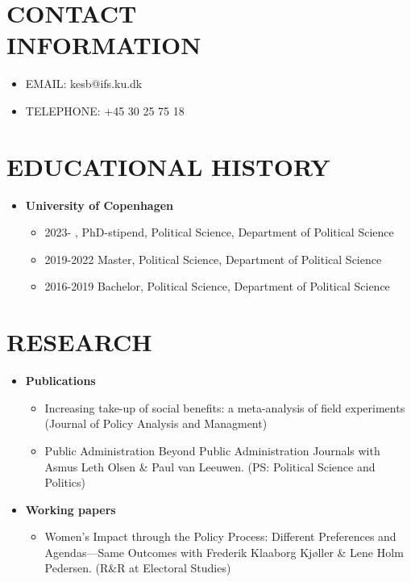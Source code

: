 \documentclass[line,margin]{res}
\begin{document}

\begin{resume}
\section{CONTACT \\ INFORMATION}
 
\begin{itemize}
    \item EMAIL:  kesb@ifs.ku.dk 
    \item TELEPHONE: +45 30 25 75 18
\end{itemize}

\section{EDUCATIONAL HISTORY}
\begin{itemize}
\item \textbf{University of Copenhagen}
\begin{itemize}
 \item 2023- , PhD-stipend,  Political Science, Department of Political Science 
\item 2019-2022 Master, Political Science, Department of Political Science
       \item 2016-2019 Bachelor, Political Science, Department of Political Science 
\end{itemize}
\end{itemize}

\section{RESEARCH}
\begin{itemize}
    \item \textbf{Publications}
\begin{itemize}
\item Increasing take-up of social benefits: a meta-analysis of field experiments (Journal of Policy Analysis and Managment)

\item Public Administration Beyond Public Administration Journals with Asmus Leth Olsen \& Paul van Leeuwen. (PS: Political Science and Politics)
\end{itemize}

    \item \textbf{Working papers}
\begin{itemize}
\item Women’s Impact through the Policy Process: Different Preferences and Agendas---Same Outcomes with Frederik Klaaborg Kjøller \& Lene Holm Pedersen. (R\&R at Electoral Studies)


\end{itemize}
\end{itemize}
\end{resume}
\end{document}
